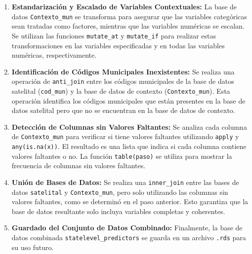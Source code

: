\documentclass[
  12pt,
]{book}
\begin{document}
\begin{enumerate}
\def\labelenumi{\arabic{enumi}.}
\item
  \textbf{Estandarización y Escalado de Variables Contextuales:}
  La base de datos \texttt{Contexto\_mun} se transforma para asegurar que las variables categóricas sean tratadas como factores, mientras que las variables numéricas se escalan. Se utilizan las funciones \texttt{mutate\_at} y \texttt{mutate\_if} para realizar estas transformaciones en las variables especificadas y en todas las variables numéricas, respectivamente.
\item
  \textbf{Identificación de Códigos Municipales Inexistentes:}
  Se realiza una operación de \texttt{anti\_join} entre los códigos municipales de la base de datos satelital (\texttt{cod\_mun}) y la base de datos de contexto (\texttt{Contexto\_mun}). Esta operación identifica los códigos municipales que están presentes en la base de datos satelital pero que no se encuentran en la base de datos de contexto.
\item
  \textbf{Detección de Columnas sin Valores Faltantes:}
  Se analiza cada columna de \texttt{Contexto\_mun} para verificar si tiene valores faltantes utilizando \texttt{apply} y \texttt{any(is.na(x))}. El resultado es una lista que indica si cada columna contiene valores faltantes o no. La función \texttt{table(paso)} se utiliza para mostrar la frecuencia de columnas sin valores faltantes.
\item
  \textbf{Unión de Bases de Datos:}
  Se realiza una \texttt{inner\_join} entre las bases de datos \texttt{satelital} y \texttt{Contexto\_mun}, pero solo utilizando las columnas sin valores faltantes, como se determinó en el paso anterior. Esto garantiza que la base de datos resultante solo incluya variables completas y coherentes.
\item
  \textbf{Guardado del Conjunto de Datos Combinado:}
  Finalmente, la base de datos combinada \texttt{statelevel\_predictors} se guarda en un archivo \texttt{.rds} para su uso futuro.
\end{enumerate}
\end{document}

